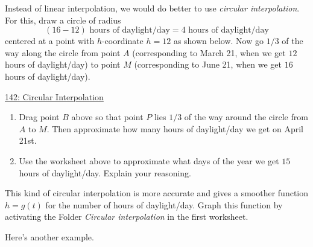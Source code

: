 \documentclass{ximera}
\begin{document}
\begin{example}
Instead of linear interpolation, we would do better to use \emph{circular interpolation}. For this, draw a circle of radius 
\[
     (16 - 12) \text{ hours of daylight/day} = 4 \text{ hours of daylight/day}
\]
centered at a point with $h$-coordinate $h=12$ as shown below. Now go $1/3$ of the way along the circle from point $A$ (corresponding to March 21, when we get $12$ hours of daylight/day) to point $M$ (corresponding to June 21, when we get $16$ hours of daylight/day).

 
\begin{onlineOnly}
    \begin{center}
\end{center}
\end{onlineOnly}

\href{https://www.desmos.com/calculator/nfsifbppzz}{142: Circular Interpolation}

\begin{enumerate}
\item Drag point $B$ above so that point $P$ lies $1/3$ of the way around the circle from $A$ to $M$. Then approximate how many hours of daylight/day we get on April 21st.
\begin{freeResponse} 
\end{freeResponse}

\item Use the worksheet above to approximate what days of the year we get $15$ hours of daylight/day. Explain your reasoning.
\begin{freeResponse}
\end{freeResponse}
\end{enumerate}

This kind of circular interpolation is more accurate and gives a smoother function $h=g(t)$ for the number of hours of daylight/day. Graph this function by activating the Folder \emph{Circular interpolation} in the first worksheet.

\end{example}


Here's another example.
\end{document}
